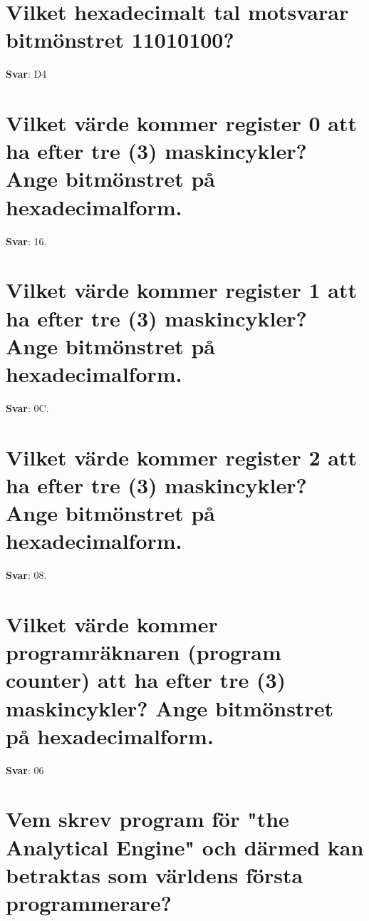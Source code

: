 \documentclass[a4paper,11pt,oneside]{book}
\begin{document}
\begin{sloppypar}
\section{Vilket hexadecimalt tal motsvarar bitm\"onstret 11010100?}

\label{q:429:sa:sv:True}

\textbf{Svar}: D4



\section{Vilket v\"arde kommer register 0 att ha efter tre (3) maskincykler? Ange bitm\"onstret p\r{a} hexadecimalform.}

\label{q:430:sa:sv:True}

\textbf{Svar}: 16.



\section{Vilket v\"arde kommer register 1 att ha efter tre (3) maskincykler? Ange bitm\"onstret p\r{a} hexadecimalform.}

\label{q:431:sa:sv:True}

\textbf{Svar}: 0C.



\section{Vilket v\"arde kommer register 2 att ha efter tre (3) maskincykler? Ange bitm\"onstret p\r{a} hexadecimalform.}

\label{q:432:sa:sv:True}

\textbf{Svar}: 08.



\section{Vilket v\"arde kommer programr\"aknaren (program counter) att ha efter tre (3) maskincykler? Ange bitm\"onstret p\r{a} hexadecimalform.}

\label{q:433:sa:sv:True}

\textbf{Svar}: 06



\section{Vem skrev program f\"or "the Analytical Engine" och d\"armed kan betraktas som v\"arldens f\"orsta programmerare?}


\end{sloppypar}
\end{document}
